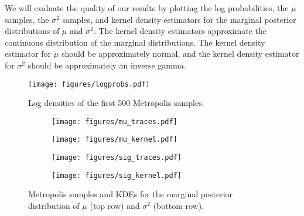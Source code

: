 We will evaluate the quality of our results by plotting the log probabilities, the $\mu$ samples, the $\sigma^2$ samples, and kernel density estimators for the marginal posterior distributions of $\mu$ and $\sigma^2$.
The kernel density estimators approximate the continuous distribution of the marginal distributions.
The kernel density estimator for $\mu$ should be approximately normal, and the kernel density estimator for $\sigma^2$ should be approximately an inverse gamma.
\begin{figure}[H]
    \centering
    \texttt{[image: figures/logprobs.pdf]}
    \caption{Log densities of the first 500 Metropolis samples.}
    \label{fig:logprobs}
\end{figure}

\begin{figure}[H]
    \begin{subfigure}[b]{.49\textwidth}
        \centering
        \texttt{[image: figures/mu\_traces.pdf]}
    \end{subfigure}
    \begin{subfigure}[b]{.49\textwidth}
        \centering
        \texttt{[image: figures/mu\_kernel.pdf]}
    \end{subfigure}
    \begin{subfigure}[b]{.49\textwidth}
        \centering
        \texttt{[image: figures/sig\_traces.pdf]}
    \end{subfigure}
    \begin{subfigure}[b]{.49\textwidth}
        \centering
        \texttt{[image: figures/sig\_kernel.pdf]}
    \end{subfigure}
\caption{Metropolis samples and KDEs for the marginal posterior distribution of $\mu$ (top row) and $\sigma^2$ (bottom row).}
\label{fig:metropolis_results}
\end{figure}


